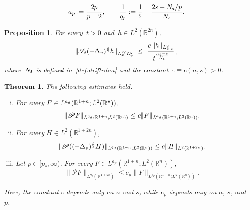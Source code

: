 \documentclass[10pt,a4paper]{amsart}
\theoremstyle{plain}
\newtheorem{theorem}{Theorem}
\newtheorem{prop}{Proposition}
\theoremstyle{remark}
\def\er{\mathbb{R}}
\def\ern{\mathbb{R}^n}
\begin{document}
\begin{equation}\label{sharp:m1:eq_ap_qp}
a_p:=\frac{2p}{p+2},
\qquad
\frac1{q_p}:=\frac12-\frac{2s-N_{\rm d}/p}{N_s}.
\end{equation}

\begin{prop}\label{sharp:m1:prop_fixed_negative}
For every~$t>0$ and~$h\in L^2(\er^{2n})$,
\begin{equation}
\label{sharp:m1:eq_fixed_negative}
\|\mathscr{S}_t(-\Delta_v)^\frac{s}{2}h\|_{L^{q_{\rm d}}_xL^2_v} \ \leq \ \frac{c\,\|h\|_{L^2_{x,v}}}{t^\frac{N_{\tt d}-s}{N_{\tt d}}}\,,
\end{equation}
where~$N_{\tt d}$ is defined in~\eqref{def:drift-dim} and the constant~$c\equiv c(n,s)>0$.
\end{prop}

\begin{theorem}
\label{sharp:thm_mixed_parametrix}
The following estimates hold.
\begin{enumerate}[(i)]
\item For every $F\in L^{a_{\rm d}}(\er^{1+n};L^2(\ern))$,
\begin{equation}
\label{sharp:m1:eq_K1}
\|\mathscr{P}F\|_{L^{q_{\rm d}}(\er^{1+n};L^2(\ern))}
\leq c\|F\|_{L^{a_{\rm d}}(\er^{1+n};L^2(\ern))}.
\end{equation}
\item For every $H\in L^2(\er^{1+2n})$,
\begin{equation}
\label{sharp:m1:eq_K2}
\|\mathscr P((-\Delta_v)^\frac{s}{2}H)\|_{L^{q_{\rm d}}(\er^{1+n};L^2(\ern))}
\leq c\|H\|_{L^2(\er^{1+2n})}.
\end{equation}
\item Let $p\in[p_*,\infty)$. For every $F\in L^{a_p}(\er^{1+n};L^2(\ern))$,
\begin{equation}
\label{sharp:m1:eq_K3}
\|\mathscr P F\|_{L^{q_p}(\er^{1+2n})}
\leq c_p\|F\|_{L^{a_p}(\er^{1+n};L^2(\ern))}.
\end{equation}
\end{enumerate}
Here, the constant $c$ depends only on $n$ and $s$, while $c_p$ depends only on $n$, $s$, and $p$.
\end{theorem}
\end{document}
